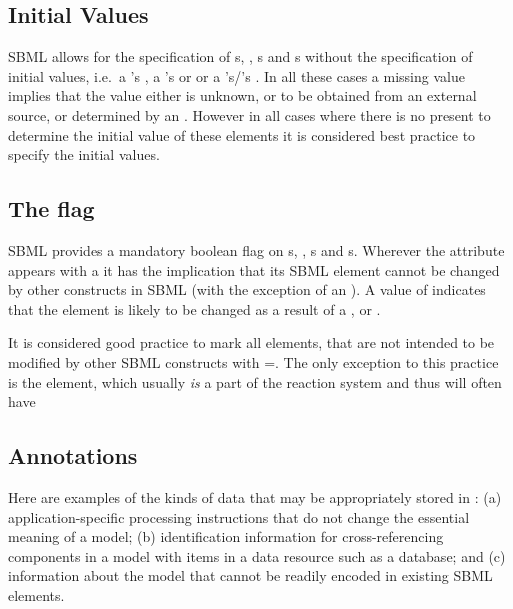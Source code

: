 \subsection{Initial Values}
\label{sec:bp:initialvalues}
SBML allows for the specification of \Compartment{}s, \Species, 
\Parameter{}s and \LocalParameter{}s without the specification of 
initial values, i.e.\ a \Compartment{}'s , a \Species{}'s 
 or  or a 
\Parameter{}'s/\LocalParameter{}'s . In all these cases 
a missing value implies that the value either is unknown, or to be 
obtained from an external source, or determined by an \InitialAssignment. 
However in all cases where 
there is no \InitialAssignment present to determine the initial value
of these elements it is considered best practice to specify the 
initial values.

\subsection{The  flag}
\label{sec:bp:constant}
SBML provides a mandatory boolean flag  on \Compartment{}s, 
\Species, \SpeciesReference{}s and \Parameter{}s. Wherever the  attribute 
appears with a  it has the implication that its SBML element cannot be 
changed by other constructs  in SBML (with the exception of an \InitialAssignment ). 
A value of  indicates that the element is likely to be changed as a 
result of a \Rule, \Reaction or \Event. 

It is considered good practice to mark all elements, that are not intended to be 
modified by other SBML constructs with =. The only exception
to this practice is the \Species element, which usually \emph{is} a part of the reaction 
system and thus will often have 

\subsection{Annotations}
\label{sec:bp:annotations}

Here are examples of the kinds of data that may be appropriately
stored in : (a) application-specific processing
instructions that do not change the essential meaning of a model;
(b) identification information for cross-referencing components in
a model with items in a data resource such as a database;
and (c) information about the model that cannot be
readily encoded in existing SBML elements.

